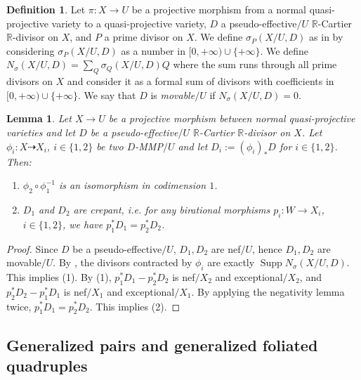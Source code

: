 \documentclass[11pt]{amsart}
\numberwithin{equation}{section}
\newcommand{\Rr}{\mathbb{R}}
\newcommand{\Supp}{\operatorname{Supp}}
\newtheorem{lem}[thm]{Lemma}
\theoremstyle{definition}
\newtheorem{defn}[thm]{Definition}
\theoremstyle{definition}
\theoremstyle{definition}
\begin{document}
\begin{defn}
    Let $\pi: X\rightarrow U$ be a projective morphism from a normal quasi-projective variety to a quasi-projective variety, $D$ a pseudo-effective$/U$ $\Rr$-Cartier $\Rr$-divisor on $X$, and $P$ a prime divisor on $X$. We define $\sigma_{P}(X/U,D)$ as in \cite[Definition 3.1]{LX23a} by considering $\sigma_{P}(X/U,D)$ as a number in  $[0,+\infty)\cup\{+\infty\}$. We define $N_{\sigma}(X/U,D)=\sum_Q\sigma_Q(X/U,D)Q$
    where the sum runs through all prime divisors on $X$ and consider it as a formal sum of divisors with coefficients in $[0,+\infty)\cup\{+\infty\}$. We say that $D$ is \emph{movable$/U$} if $N_{\sigma}(X/U,D)=0$.
\end{defn}

\begin{lem}\label{lem: output of MMP isomorphic in codimension 1}
  Let $X\rightarrow U$ be a projective morphism between normal quasi-projective varieties and let $D$ be a pseudo-effective$/U$ $\Rr$-Cartier $\Rr$-divisor on $X$. Let $\phi_i: X\dashrightarrow X_i$, $i\in\{1,2\}$ be two $D$-MMP$/U$ and let $D_i:=(\phi_i)_*D$ for $i\in\{1,2\}$. Then:
  \begin{enumerate}
      \item $\phi_2\circ\phi^{-1}_1$ is an isomorphism in codimension $1$.
      \item $D_1$ and $D_2$ are crepant, i.e. for any birational morphisms $p_i: W\rightarrow X_i$, $i\in\{1,2\}$, we have $p_1^*D_1=p_2^*D_2$.
  \end{enumerate}
\end{lem}
\begin{proof}
Since $D$ be a pseudo-effective$/U$, $D_1,D_2$ are nef$/U$, hence $D_1,D_2$ are movable$/U$. By \cite[Lemma 2.25]{LMX24b}, the divisors contracted by $\phi_i$ are exactly $\Supp N_{\sigma}(X/U,D)$. This implies (1). By (1), $p_1^*D_1-p_2^*D_2$ is nef$/X_2$ and exceptional$/X_2$, and $p_2^*D_2-p_1^*D_1$ is nef$/X_1$ and exceptional$/X_1$. By applying the negativity lemma twice, $p_1^*D_1=p_2^*D_2$. This implies (2).
\end{proof}

\subsection{Generalized pairs and generalized foliated quadruples}
\end{document}
